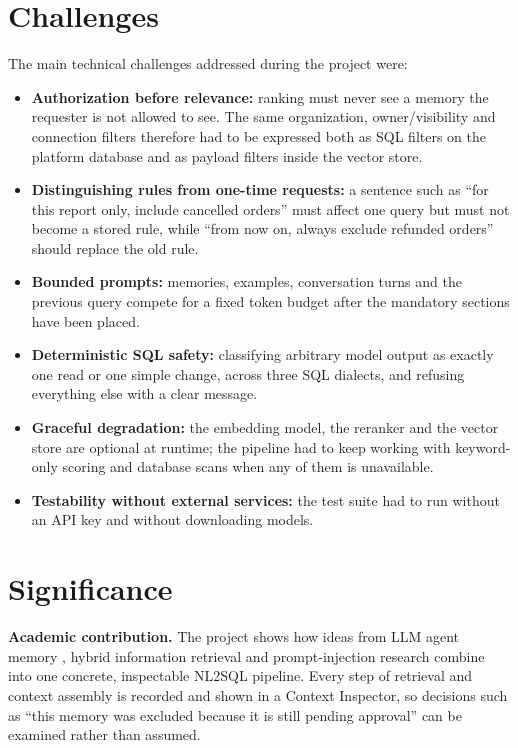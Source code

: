 \section{Challenges}
The main technical challenges addressed during the project were:

\begin{itemize}[leftmargin=*, topsep=4pt, itemsep=4pt]
    \item \textbf{Authorization before relevance:} ranking must never see a memory the
          requester is not allowed to see. The same organization, owner/visibility and
          connection filters therefore had to be expressed both as SQL filters on the
          platform database and as payload filters inside the vector store.
    \item \textbf{Distinguishing rules from one-time requests:} a sentence such as ``for this
          report only, include cancelled orders'' must affect one query but must not become
          a stored rule, while ``from now on, always exclude refunded orders'' should
          replace the old rule.
    \item \textbf{Bounded prompts:} memories, examples, conversation turns and the previous
          query compete for a fixed token budget after the mandatory sections have been
          placed.
    \item \textbf{Deterministic SQL safety:} classifying arbitrary model output as exactly
          one read or one simple change, across three SQL dialects, and refusing everything
          else with a clear message.
    \item \textbf{Graceful degradation:} the embedding model, the reranker and the vector
          store are optional at runtime; the pipeline had to keep working with keyword-only
          scoring and database scans when any of them is unavailable.
    \item \textbf{Testability without external services:} the test suite had to run without
          an API key and without downloading models.
\end{itemize}

\section{Significance}
\textbf{Academic contribution.} The project shows how ideas from LLM agent memory
\cite{sumers2023coala, packer2023memgpt}, hybrid information retrieval
\cite{robertson2009bm25, cormack2009rrf, nogueira2019passage} and prompt-injection research
\cite{greshake2023indirect} combine into one concrete, inspectable NL2SQL pipeline. Every
step of retrieval and context assembly is recorded and shown in a Context Inspector, so
decisions such as ``this memory was excluded because it is still pending approval'' can be
examined rather than assumed.

